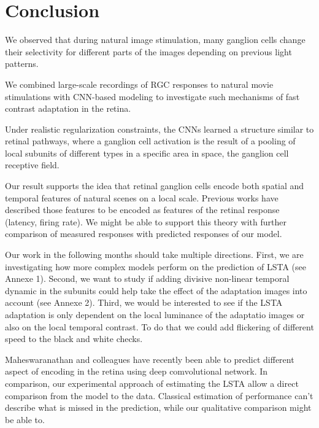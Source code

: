 \section{Conclusion}\label{sec:Conclusion}

We observed that during natural image stimulation, many ganglion cells change
their selectivity for different parts of the images depending on previous light
patterns.

We combined large-scale recordings of RGC responses to natural movie
stimulations with CNN-based modeling to investigate such mechanisms of fast
contrast adaptation in the retina.

Under realistic regularization constraints, the CNNs learned a structure
similar to retinal pathways, where a ganglion cell activation is the result of
a pooling of local subunits of different types in a specific area in space, the
ganglion cell receptive field.

Our result supports the idea that retinal ganglion cells encode both
spatial and temporal features of natural scenes on a local scale.
Previous works have described those features to be encoded as features of the
retinal response (latency, firing rate). We might be able to support this
theory with further comparison of measured responses with predicted responses
of
our model.


Our work in the following months should take multiple directions. First, we are
investigating how more complex models perform on the prediction of LSTA (see
Annexe 1).
Second, we want to study if adding divisive non-linear temporal
dynamic in the subunits could help take the effect of the adaptation images
into
account (see Annexe 2).
Third, we would be interested to see if the LSTA adaptation is only dependent
on the local luminance of the adaptatio images or also on the local temporal
contrast. To do that we could add flickering of different speed to the black
and white checks.


Maheswaranathan and colleagues \citep{maheswaranathan_interpreting_2023} have
recently
been able to predict different aspect of encoding in the retina using deep
comvolutional network. In comparison, our experimental approach of estimating
the LSTA allow a direct comparison from the model to the data. Classical
estimation of performance can't describe what is missed in the prediction,
while our qualitative comparison might be able to.

